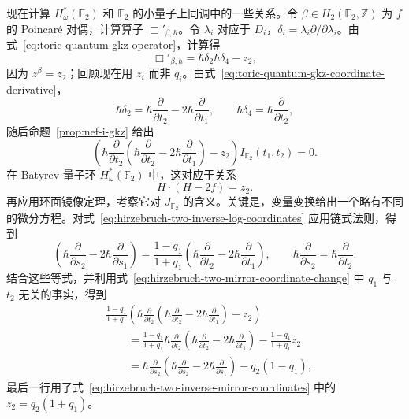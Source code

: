 \begin{example}
 现在计算 $H_\omega^*(\mathbb F_2)$ 和 $\mathbb F_2$ 的小量子上同调中的一些关系。令 $\beta\in H_2(\mathbb F_2,\mathbb Z)$ 为 $f$ 的 Poincaré 对偶，计算算子 $\Box'_{\beta,\hbar}$。令 $\lambda_i$ 对应于 $D_i$，$\delta_i=\lambda_i\partial/\partial\lambda_i$。由式~\eqref{eq:toric-quantum-gkz-operator}，计算得
\[
\Box'_{\beta,\hbar}=\hbar\delta_2\hbar\delta_4-z_2,
\]
因为 $z^\beta=z_2$；回顾现在用 $z_i$ 而非 $q_i$。由式~\eqref{eq:toric-quantum-gkz-coordinate-derivative}，
\[
\hbar\delta_2=\hbar\frac\partial{\partial t_2}-2\hbar\frac\partial{\partial t_1},\qquad
\hbar\delta_4=\hbar\frac\partial{\partial t_2},
\]
随后命题~\ref{prop:nef-i-gkz} 给出
\begin{equation}\label{eq:hirzebruch-two-i-quantum-equation}
\left(\hbar\frac\partial{\partial t_2}\left(\hbar\frac\partial{\partial t_2}-2\hbar\frac\partial{\partial t_1}\right)-z_2\right)I_{\mathbb F_2}(t_1,t_2)=0.
\end{equation}
在 Batyrev 量子环 $H_\omega^*(\mathbb F_2)$ 中，这对应于关系
\begin{equation}\label{eq:hirzebruch-two-batyrev-quantum-relation}
H\mathbin{\cdot}(H-2f)=z_2.
\end{equation}
 再应用环面镜像定理，考察它对 $J_{\mathbb F_2}$ 的含义。关键是，变量变换给出一个略有不同的微分方程。对式~\eqref{eq:hirzebruch-two-inverse-log-coordinates} 应用链式法则，得到
\[
\left(\hbar\frac\partial{\partial s_2}-2\hbar\frac\partial{\partial s_1}\right)
=\frac{1-q_1}{1+q_1}\left(\hbar\frac\partial{\partial t_2}-2\hbar\frac\partial{\partial t_1}\right),\qquad
\hbar\frac\partial{\partial s_2}=\hbar\frac\partial{\partial t_2}.
\]
结合这些等式，并利用式~\eqref{eq:hirzebruch-two-mirror-coordinate-change} 中 $q_1$ 与 $t_2$ 无关的事实，得到
\[
\begin{aligned}
&\frac{1-q_1}{1+q_1}\left(\hbar\frac\partial{\partial t_2}\left(\hbar\frac\partial{\partial t_2}-2\hbar\frac\partial{\partial t_1}\right)-z_2\right)\\
&\qquad=\frac{1-q_1}{1+q_1}\hbar\frac\partial{\partial t_2}\left(\hbar\frac\partial{\partial t_2}-2\hbar\frac\partial{\partial t_1}\right)-\frac{1-q_1}{1+q_1}z_2\\
&\qquad=\hbar\frac\partial{\partial s_2}\left(\hbar\frac\partial{\partial s_2}-2\hbar\frac\partial{\partial s_1}\right)-q_2(1-q_1),
\end{aligned}
\]
最后一行用了式~\eqref{eq:hirzebruch-two-inverse-mirror-coordinates} 中的 $z_2=q_2(1+q_1)$。


\end{example}

